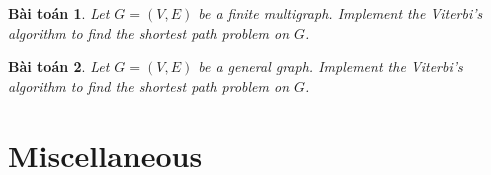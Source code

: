 \documentclass{article}
\newtheorem{baitoan}{Bài toán}
\begin{document}
\begin{baitoan}
    Let $G = (V,E)$ be a finite multigraph. Implement the Viterbi's algorithm to find the shortest path problem on $G$.
\end{baitoan}

\begin{baitoan}
    Let $G = (V,E)$ be a general graph. Implement the Viterbi's algorithm to find the shortest path problem on $G$.
\end{baitoan}


\section{Miscellaneous}


\printbibliography[heading=bibintoc]
    
\end{document}
